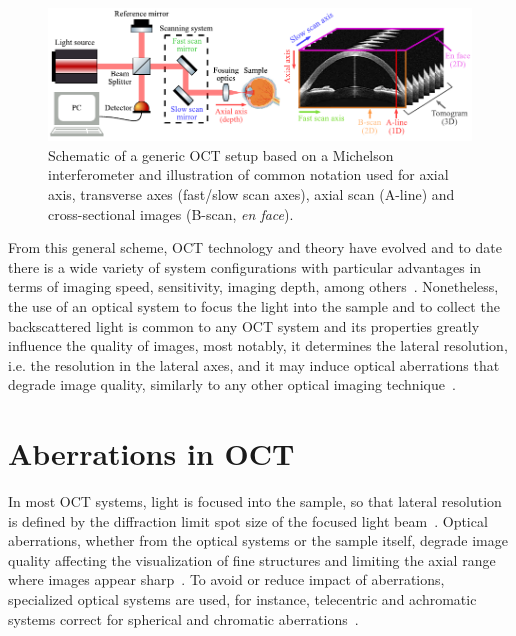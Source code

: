 \begin{figure}
    \centering
    \includegraphics[width=\textwidth]{Figures/Introduction/OCT_ScanningSchemes.pdf}
    \caption[Schematic of a generic OCT setup based on a Michelson interferometer and illustration of common notation.]{Schematic of a generic OCT setup based on a Michelson interferometer and illustration of common notation used for axial axis, transverse axes (fast/slow scan axes), axial scan (A-line) and cross-sectional images (B-scan, \textit{en face}).}
    \label{fig:OCT_ScanningScheme}
\end{figure}

From this general scheme, OCT technology and theory have evolved and to date there is a wide variety of system configurations with particular advantages in terms of imaging speed, sensitivity, imaging depth, among others~\cite{Fujimoto2015_Introduction}. Nonetheless, the use of an optical system to focus the light into the sample and to collect the backscattered light is common to any OCT system and its properties greatly influence the quality of images, most notably, it determines the lateral resolution, i.e. the resolution in the lateral axes, and it may induce optical aberrations that degrade image quality, similarly to any other optical imaging technique~\cite{Ralston2006_Interferometric, Yasuno2006_Noniterative, Adie2012_Computational}.

\section{Aberrations in OCT}

In most OCT systems, light is focused into the sample, so that lateral resolution is defined by the diffraction limit spot size of the focused light beam~\cite{Fujimoto2015_Introduction}. Optical aberrations, whether from the optical systems or the sample itself, degrade image quality affecting the visualization of fine structures and limiting the axial range where images appear sharp~\cite{Ralston2006_Interferometric,Zawadzki2005_Adaptiveoptics}. To avoid or reduce impact of aberrations, specialized optical systems are used, for instance, telecentric and achromatic systems correct for spherical and chromatic aberrations~\cite{Hu2015_Optical}.

